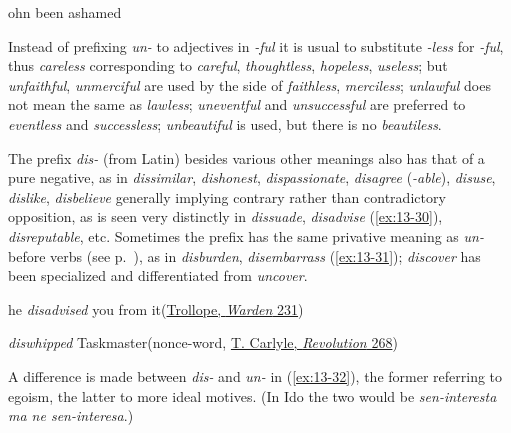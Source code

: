 \ea \label{ex:13-29}
ohn been ashamed
\hfill\citep[364 \textsc{on-}, \textit{pref.}]{wright1905english4}
\z

Instead of prefixing \textit{un-} to adjectives in \textit{-ful} it is usual to substitute \textit{-less} for \textit{-ful}, thus \textit{careless} corresponding to \textit{careful}, \textit{thoughtless}, \textit{hopeless}, \textit{useless}; but \textit{unfaithful}, \textit{unmerciful} are used by the side of \textit{faithless}, \textit{merciless}; \textit{unlawful} does not mean the same as \textit{lawless}; \textit{uneventful} and \textit{unsuccessful} are preferred to \textit{eventless} and \textit{successless}; \textit{unbeautiful} is used, but there is no \textit{beautiless}.



The prefix \textit{dis-} (from 
Latin) besides various other meanings also has that of a pure negative, as in \textit{dissimilar}, \textit{dishonest}, \textit{dispassionate}, \textit{disagree} (\textit{-able}), \textit{disuse}, \textit{dislike}, \textit{disbelieve} generally implying contrary rather than contradictory opposition, as is seen very distinctly in \textit{dissuade}, \textit{disadvise} (\ref{ex:13-30}), \textit{disreputable}, etc. Sometimes the prefix has the same privative meaning as \textit{un-} before verbs (see p.~\pageref{privative_un}), as in \textit{disburden}, \textit{disembarrass} (\ref{ex:13-31}); \textit{discover} has been specialized and differentiated from \textit{uncover}.

\ea \label{ex:13-30}
he \emph{disadvised} you from it\hfill(\href{https://archive.org/details/warden0000anth_w6p5/page/218/mode/2up?q=%22disadvised+you%22&view=theater}{Trollope, \textit{Warden} 231})
\z

\ea\label{ex:13-31}
\emph{diswhipped} Taskmaster\hfill(nonce-word, \href{https://archive.org/details/gri_33125008092856/page/n247/mode/2up?q=%22diswhipped&view=theater}{T. Carlyle, \textit{Revolution} 268})
\z

A difference is made between \textit{dis-} and \textit{un-} in (\ref{ex:13-32}), the former referring to egoism, the latter to more ideal motives. (In Ido the two would be \textit{sen-interesta ma ne sen-interesa}.)

